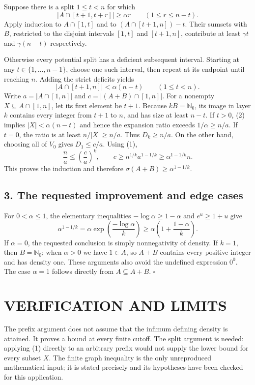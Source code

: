 Suppose there is a split $1\leq t<n$ for which
\[
 |A\cap[t+1,t+r]|\geq\alpha r\qquad(1\leq r\leq n-t).
\]
Apply induction to $A\cap[1,t]$ and to
$(A\cap[t+1,n])-t$. Their sumsets with $B$, restricted to the disjoint
intervals $[1,t]$ and $[t+1,n]$, contribute at least $\gamma t$ and
$\gamma(n-t)$ respectively.

Otherwise every potential split has a deficient subsequent interval.
Starting at any $t\in\{1,\ldots,n-1\}$, choose one such interval,
then repeat at its endpoint until reaching $n$. Adding the strict
deficits yields
\[
 |A\cap[t+1,n]|<\alpha(n-t)\qquad(1\leq t<n).         \tag{2}
\]
Write $a=|A\cap[1,n]|$ and $c=|(A+B)\cap[1,n]|$.
For a nonempty $X\subseteq A\cap[1,n]$, let its first element be
$t+1$. Because $kB=\mathbb N_0$, its image in layer $k$ contains
every integer from $t+1$ to $n$, and has size at least $n-t$.
If $t>0$, (2) implies $|X|<\alpha(n-t)$ and hence the expansion
ratio exceeds $1/\alpha\geq n/a$. If $t=0$, the ratio is at least
$n/|X|\geq n/a$. Thus $D_k\geq n/a$.
On the other hand, choosing all of $V_0$ gives $D_1\leq c/a$.
Using (1),
\[
 \frac na\leq\left(\frac ca\right)^k,
 \qquad c\geq n^{1/k}a^{1-1/k}
 \geq\alpha^{1-1/k}n.
\]
This proves the induction and therefore
$\sigma(A+B)\geq\alpha^{1-1/k}$.

\subsection{3. The requested improvement and edge cases}
For $0<\alpha\leq1$, the elementary inequalities
$-\log\alpha\geq1-\alpha$ and $e^u\geq1+u$ give
\[
 \alpha^{1-1/k}
 =\alpha\exp\left(\frac{-\log\alpha}{k}\right)
 \geq\alpha\left(1+\frac{1-\alpha}{k}\right).
\]
If $\alpha=0$, the requested conclusion is simply nonnegativity of
density. If $k=1$, then $B=\mathbb N_0$; when $\alpha>0$ we have
$1\in A$, so $A+B$ contains every positive integer and has density
one. These arguments also avoid the undefined expression $0^0$.
The case $\alpha=1$ follows directly from $A\subseteq A+B$.
\hfill$\square$

\section{VERIFICATION AND LIMITS}
The prefix argument does not assume that the infimum defining density
is attained. It proves a bound at every finite cutoff. The split
argument is needed: applying (1) directly to an arbitrary prefix would
not supply the lower bound for every subset $X$. The finite graph
inequality is the only unreproduced mathematical input; it is stated
precisely and its hypotheses have been checked for this application.


